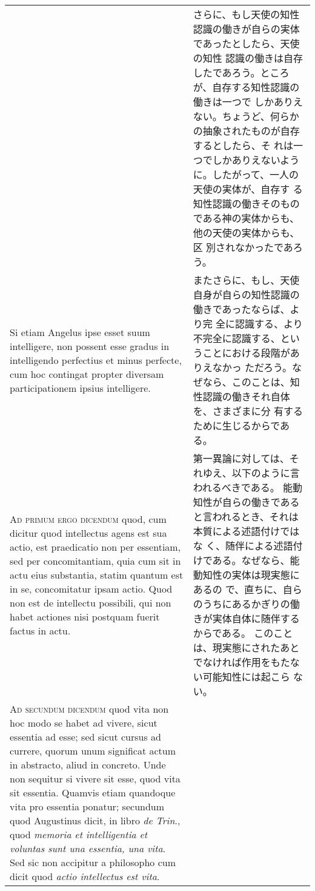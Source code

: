 \documentclass[10pt]{jsarticle} %
\begin{document}
\begin{longtable}{p{21em}p{21em}}
&

さらに、もし天使の知性認識の働きが自らの実体であったとしたら、天使の知性
 認識の働きは自存したであろう。ところが、自存する知性認識の働きは一つで
 しかありえない。ちょうど、何らかの抽象されたものが自存するとしたら、そ
 れは一つでしかありえないように。したがって、一人の天使の実体が、自存す
 る知性認識の働きそのものである神の実体からも、他の天使の実体からも、区
 別されなかったであろう。


\\

Si etiam Angelus ipse esset suum
 intelligere, non possent esse gradus in intelligendo perfectius et
 minus perfecte, cum hoc contingat propter diversam participationem
 ipsius intelligere.

&


またさらに、もし、天使自身が自らの知性認識の働きであったならば、より完
 全に認識する、より不完全に認識する、ということにおける段階がありえなかっ
 ただろう。なぜなら、このことは、知性認識の働きそれ自体を、さまざまに分
 有するために生じるからである。

\\


{\scshape  Ad primum ergo dicendum} quod, cum dicitur quod intellectus
 agens est sua actio, est praedicatio non per essentiam, sed per
 concomitantiam, quia cum sit in actu eius substantia, statim quantum
 est in se, concomitatur ipsam actio. Quod non est de intellectu
 possibili, qui non habet actiones nisi postquam fuerit factus in actu.

&

第一異論に対しては、それゆえ、以下のように言われるべきである。
能動知性が自らの働きであると言われるとき、それは本質による述語付けではな
 く、随伴による述語付けである。なぜなら、能動知性の実体は現実態にあるの
 で、直ちに、自らのうちにあるかぎりの働きが実体自体に随伴するからである。
このことは、現実態にされたあとでなければ作用をもたない可能知性には起こら
 ない。

\\


{\scshape  Ad secundum dicendum} quod vita non hoc modo se habet ad
 vivere, sicut essentia ad esse; sed sicut cursus ad currere, quorum
 unum significat actum in abstracto, aliud in concreto. Unde non
 sequitur si vivere sit esse, quod vita sit essentia. Quamvis etiam
 quandoque vita pro essentia ponatur; secundum quod Augustinus dicit, in
 libro {\itshape de Trin}., quod {\itshape memoria et intelligentia et voluntas sunt una
 essentia, una vita}. Sed sic non accipitur a philosopho cum dicit quod
 {\itshape actio intellectus est vita}.


\end{longtable}
\end{document}
